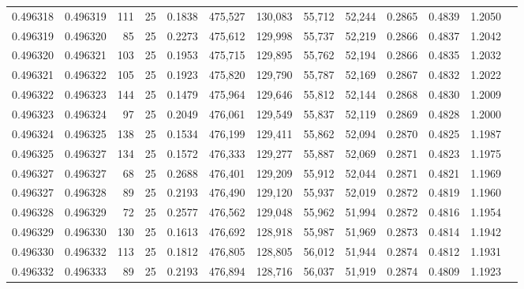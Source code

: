 \begin{tabular}{rrrrrrrrrrrrr}
0.496318 & 0.496319 &   111 &  25 &                                     0.1838 & 475,527 & 130,083 &  55,712 &  52,244 & 0.2865 & 0.4839 & 1.2050 \\
0.496319 & 0.496320 &    85 &  25 &                                     0.2273 & 475,612 & 129,998 &  55,737 &  52,219 & 0.2866 & 0.4837 & 1.2042 \\
0.496320 & 0.496321 &   103 &  25 &                                     0.1953 & 475,715 & 129,895 &  55,762 &  52,194 & 0.2866 & 0.4835 & 1.2032 \\
0.496321 & 0.496322 &   105 &  25 &                                     0.1923 & 475,820 & 129,790 &  55,787 &  52,169 & 0.2867 & 0.4832 & 1.2022 \\
0.496322 & 0.496323 &   144 &  25 &                                     0.1479 & 475,964 & 129,646 &  55,812 &  52,144 & 0.2868 & 0.4830 & 1.2009 \\
0.496323 & 0.496324 &    97 &  25 &                                     0.2049 & 476,061 & 129,549 &  55,837 &  52,119 & 0.2869 & 0.4828 & 1.2000 \\
0.496324 & 0.496325 &   138 &  25 &                                     0.1534 & 476,199 & 129,411 &  55,862 &  52,094 & 0.2870 & 0.4825 & 1.1987 \\
0.496325 & 0.496327 &   134 &  25 &                                     0.1572 & 476,333 & 129,277 &  55,887 &  52,069 & 0.2871 & 0.4823 & 1.1975 \\
0.496327 & 0.496327 &    68 &  25 &                                     0.2688 & 476,401 & 129,209 &  55,912 &  52,044 & 0.2871 & 0.4821 & 1.1969 \\
0.496327 & 0.496328 &    89 &  25 &                                     0.2193 & 476,490 & 129,120 &  55,937 &  52,019 & 0.2872 & 0.4819 & 1.1960 \\
0.496328 & 0.496329 &    72 &  25 &                                     0.2577 & 476,562 & 129,048 &  55,962 &  51,994 & 0.2872 & 0.4816 & 1.1954 \\
0.496329 & 0.496330 &   130 &  25 &                                     0.1613 & 476,692 & 128,918 &  55,987 &  51,969 & 0.2873 & 0.4814 & 1.1942 \\
0.496330 & 0.496332 &   113 &  25 &                                     0.1812 & 476,805 & 128,805 &  56,012 &  51,944 & 0.2874 & 0.4812 & 1.1931 \\
0.496332 & 0.496333 &    89 &  25 &                                     0.2193 & 476,894 & 128,716 &  56,037 &  51,919 & 0.2874 & 0.4809 & 1.1923 \\

\end{tabular}
